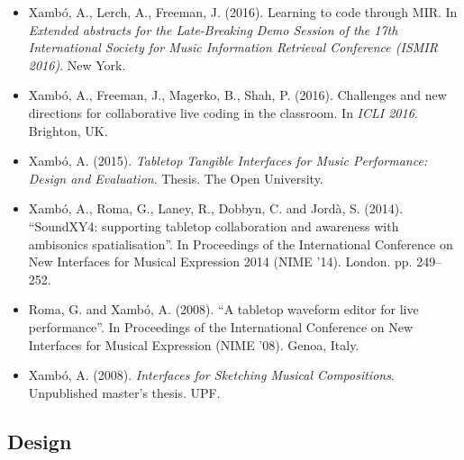 \documentclass[10pt, a4paper]{article}
\begin{document}
\begin{itemize}
\item Xambó, A., Lerch, A., Freeman, J. (2016). Learning to code through MIR. In \emph{Extended abstracts for the Late-Breaking Demo Session of the 17th International Society for Music Information Retrieval Conference (ISMIR 2016)}. New York. 
\item Xambó, A., Freeman, J., Magerko, B., Shah, P. (2016). Challenges and new directions for collaborative live coding in the classroom. In \emph{ICLI 2016}. Brighton, UK.
\item Xambó, A. (2015). \emph{Tabletop Tangible Interfaces for Music Performance: Design and Evaluation}. Thesis. The Open University.
\item Xambó, A., Roma, G., Laney, R., Dobbyn, C. and Jordà, S. (2014). “SoundXY4: supporting tabletop collaboration and awareness with ambisonics spatialisation”. In Proceedings of the International Conference on New Interfaces for Musical Expression 2014 (NIME ’14). London. pp. 249–252.
\item Roma, G. and Xambó, A. (2008). “A tabletop waveform editor for live performance”. In Proceedings of the International Conference on New Interfaces for Musical Expression (NIME ’08). Genoa, Italy.
\item Xambó, A. (2008). \emph{Interfaces for Sketching Musical Compositions}. Unpublished master’s thesis. UPF.
\end{itemize}

\subsection*{Design}
\end{document}
